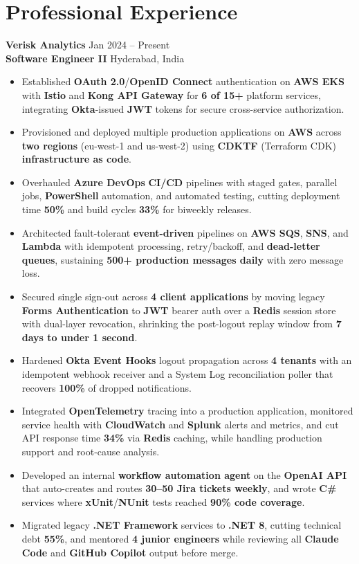\documentclass[a4paper,10pt]{article}
\begin{document}
\section*{Professional Experience}

\textbf{Verisk Analytics} \hfill Jan 2024 -- Present \\
\textbf{Software Engineer II} \hfill Hyderabad, India

\begin{itemize}[leftmargin=*]
    \item Established \textbf{OAuth 2.0}/\textbf{OpenID Connect} authentication on \textbf{AWS EKS} with \textbf{Istio} and \textbf{Kong API Gateway} for \textbf{6 of 15+} platform services, integrating \textbf{Okta}-issued \textbf{JWT} tokens for secure cross-service authorization.
    \item Provisioned and deployed multiple production applications on \textbf{AWS} across \textbf{two regions} (eu-west-1 and us-west-2) using \textbf{CDKTF} (Terraform CDK) \textbf{infrastructure as code}.
    \item Overhauled \textbf{Azure DevOps} \textbf{CI/CD} pipelines with staged gates, parallel jobs, \textbf{PowerShell} automation, and automated testing, cutting deployment time \textbf{50\%} and build cycles \textbf{33\%} for biweekly releases.
    \item Architected fault-tolerant \textbf{event-driven} pipelines on \textbf{AWS SQS}, \textbf{SNS}, and \textbf{Lambda} with idempotent processing, retry/backoff, and \textbf{dead-letter queues}, sustaining \textbf{500+ production messages daily} with zero message loss.
    \item Secured single sign-out across \textbf{4 client applications} by moving legacy \textbf{Forms Authentication} to \textbf{JWT} bearer auth over a \textbf{Redis} session store with dual-layer revocation, shrinking the post-logout replay window from \textbf{7 days to under 1 second}.
    \item Hardened \textbf{Okta Event Hooks} logout propagation across \textbf{4 tenants} with an idempotent webhook receiver and a System Log reconciliation poller that recovers \textbf{100\%} of dropped notifications.
    \item Integrated \textbf{OpenTelemetry} tracing into a production application, monitored service health with \textbf{CloudWatch} and \textbf{Splunk} alerts and metrics, and cut API response time \textbf{34\%} via \textbf{Redis} caching, while handling production support and root-cause analysis.
    \item Developed an internal \textbf{workflow automation agent} on the \textbf{OpenAI API} that auto-creates and routes \textbf{30--50 Jira tickets weekly}, and wrote \textbf{C\#} services where \textbf{xUnit}/\textbf{NUnit} tests reached \textbf{90\% code coverage}.
    \item Migrated legacy \textbf{.NET Framework} services to \textbf{.NET 8}, cutting technical debt \textbf{55\%}, and mentored \textbf{4 junior engineers} while reviewing all \textbf{Claude Code} and \textbf{GitHub Copilot} output before merge.
\end{itemize}
\end{document}
